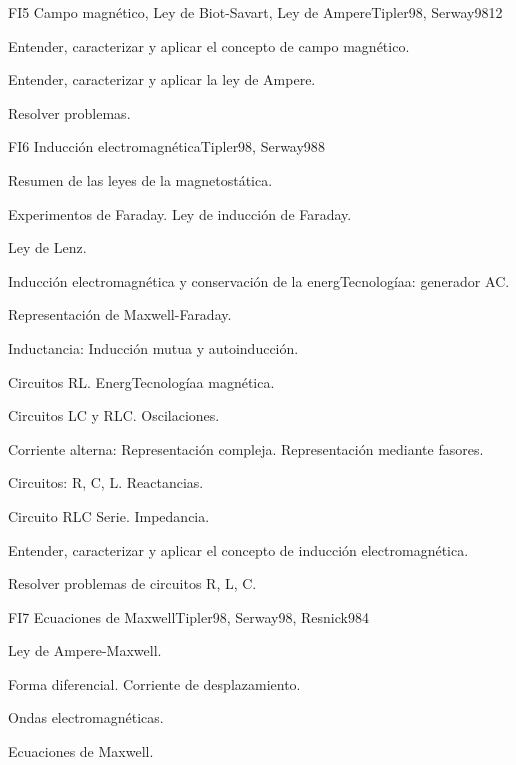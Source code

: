\begin{syllabus}
\begin{unit}{FI5 Campo magnético, Ley de Biot-Savart, Ley de Ampere}{Tipler98, Serway98}{12}
   \begin{unitgoals}
         \item  Entender, caracterizar y aplicar el concepto de campo magnético.
         \item  Entender, caracterizar y aplicar la ley de Ampere.
         \item  Resolver problemas.
   \end{unitgoals}
\end{unit}

\begin{unit}{FI6 Inducción electromagnética}{Tipler98, Serway98}{8}
   \begin{topics}
         \item  Resumen de las leyes de la magnetostática.
	 \item  Experimentos de Faraday.  Ley de inducción de Faraday.
         \item  Ley de Lenz.
	 \item  Inducción electromagnética y conservación de la energTecnologíaa: generador AC.
         \item  Representación de Maxwell-Faraday.
         \item  Inductancia: Inducción mutua y autoinducción.
         \item  Circuitos RL.  EnergTecnologíaa magnética.
         \item  Circuitos LC y RLC. Oscilaciones.
         \item  Corriente alterna: Representación compleja. Representación mediante fasores.
	 \item  Circuitos: R, C, L. Reactancias.
         \item  Circuito RLC Serie.  Impedancia.
   \end{topics}

   \begin{unitgoals}
         \item  Entender, caracterizar y aplicar el concepto de inducción electromagnética.
         \item  Resolver problemas de circuitos R, L, C.
   \end{unitgoals}
\end{unit}

\begin{unit}{FI7 Ecuaciones de Maxwell}{Tipler98, Serway98, Resnick98}{4}
   \begin{topics}
         \item  Ley de Ampere-Maxwell.
	 \item  Forma diferencial. Corriente de desplazamiento.
         \item  Ondas electromagnéticas.
	 \item  Ecuaciones de Maxwell.
   \end{topics}


\end{unit}
\end{syllabus}
